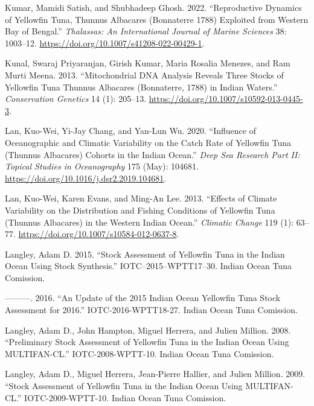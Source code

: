 \documentclass[
]{scrartcl}
\newlength{\cslhangindent}
\newenvironment{CSLReferences}[2] %
 {\begin{list}{}{%
  \setlength{\itemindent}{0pt}
  \setlength{\leftmargin}{0pt}
  \setlength{\parsep}{0pt}
  \ifodd #1
   \setlength{\leftmargin}{\cslhangindent}
   \setlength{\itemindent}{-1\cslhangindent}
  \fi
  \setlength{\itemsep}{#2\baselineskip}}}
 {\end{list}}
\begin{document}
\begin{CSLReferences}{1}{0}
Kumar, Mamidi Satish, and Shubhadeep Ghosh. 2022. {``Reproductive
{Dynamics} of {Yellowfin Tuna}, {Thunnus} Albacares ({Bonnaterre} 1788)
{Exploited} from {Western Bay} of {Bengal}.''} \emph{Thalassas: An
International Journal of Marine Sciences} 38: 1003--12.
\url{https://doi.org/10.1007/s41208-022-00429-1}.

Kunal, Swaraj Priyaranjan, Girish Kumar, Maria Rosalia Menezes, and Ram
Murti Meena. 2013. {``Mitochondrial {DNA} Analysis Reveals Three Stocks
of Yellowfin Tuna {Thunnus} Albacares ({Bonnaterre}, 1788) in {Indian}
Waters.''} \emph{Conservation Genetics} 14 (1): 205--13.
\url{https://doi.org/10.1007/s10592-013-0445-3}.

Lan, Kuo-Wei, Yi-Jay Chang, and Yan-Lun Wu. 2020. {``Influence of
Oceanographic and Climatic Variability on the Catch Rate of Yellowfin
Tuna ({Thunnus} Albacares) Cohorts in the {Indian Ocean}.''} \emph{Deep
Sea Research Part II: Topical Studies in Oceanography} 175 (May):
104681. \url{https://doi.org/10.1016/j.dsr2.2019.104681}.

Lan, Kuo-Wei, Karen Evans, and Ming-An Lee. 2013. {``Effects of Climate
Variability on the Distribution and Fishing Conditions of Yellowfin Tuna
({Thunnus} Albacares) in the Western {Indian Ocean}.''} \emph{Climatic
Change} 119 (1): 63--77.
\url{https://doi.org/10.1007/s10584-012-0637-8}.

Langley, Adam D. 2015. {``Stock Assessment of Yellowfin Tuna in the
{Indian Ocean} Using {Stock Synthesis}.''} IOTC--2015--WPTT17--30.
Indian Ocean Tuna Comission.

---------. 2016. {``An Update of the 2015 {Indian Ocean Yellowfin Tuna}
Stock Assessment for 2016.''} IOTC-2016-WPTT18-27. Indian Ocean Tuna
Comission.

Langley, Adam D., John Hampton, Miguel Herrera, and Julien Million.
2008. {``Preliminary Stock Assessment of Yellowfin Tuna in the {Indian
Ocean} Using {MULTIFAN-CL}.''} IOTC-2008-WPTT-10. Indian Ocean Tuna
Comission.

Langley, Adam D., Miguel Herrera, Jean-Pierre Hallier, and Julien
Million. 2009. {``Stock Assessment of Yellowfin Tuna in the {Indian
Ocean} Using {MULTIFAN-CL}.''} IOTC-2009-WPTT-10. Indian Ocean Tuna
Comission.


\end{CSLReferences}
\end{document}
